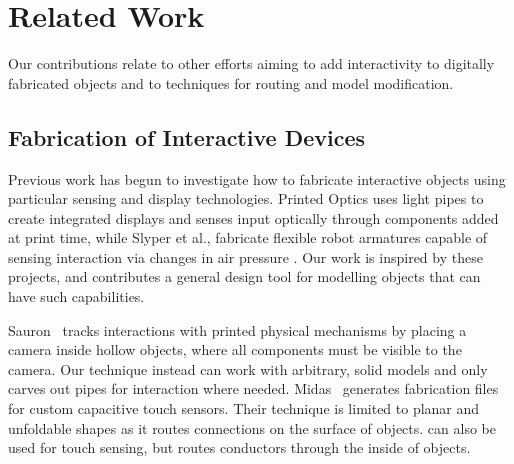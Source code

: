 \section{Related Work}
Our contributions relate to other efforts aiming to add interactivity to digitally fabricated objects and to techniques for routing and model modification.  

\subsection{Fabrication of Interactive Devices}

Previous work has begun to investigate how to fabricate interactive objects using particular sensing and display technologies. Printed Optics \cite{Willis-printedoptics} uses light pipes to create integrated displays and senses input optically through components added at print time, while Slyper et al., fabricate flexible robot armatures capable of sensing interaction via changes in air pressure \cite{Slyper-pressure}. Our work is inspired by these projects, and contributes a general design tool for modelling objects that can have such capabilities.  

Sauron~\cite{Savage-sauron} tracks interactions with printed physical mechanisms by placing a camera inside hollow objects, where all components must be visible to the camera.  Our technique instead can work with arbitrary, solid models and only carves out pipes for interaction where needed. Midas~\cite{Savage-midas} generates fabrication files for custom capacitive touch sensors.  Their technique is limited to planar and unfoldable shapes as it routes connections on the surface of objects. \systemname can also be used for touch sensing, but routes conductors through the inside of objects.


